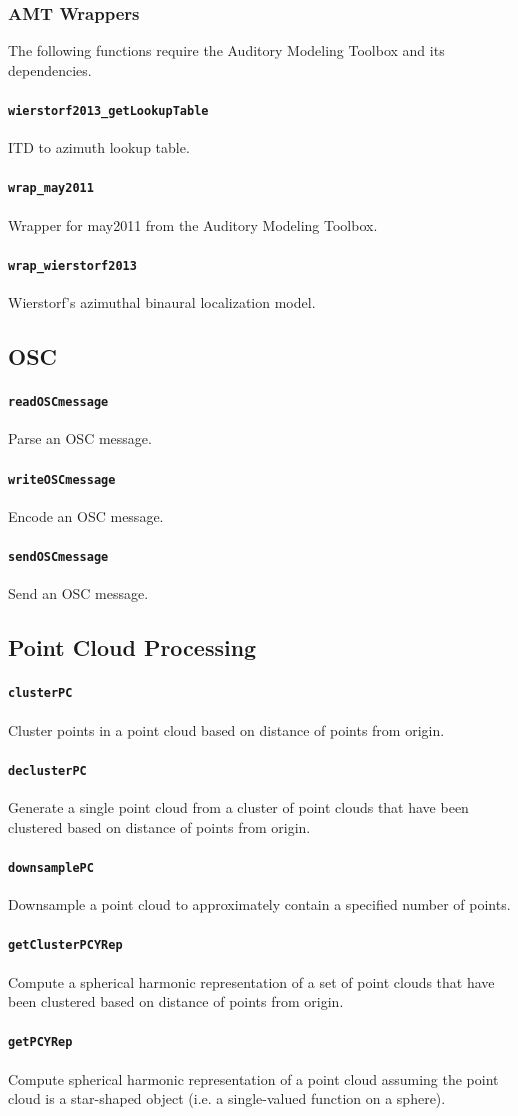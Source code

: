 \documentclass[11pt, oneside]{article}
\newcommand{\function}[1]{\paragraph*{\texttt{#1}}}
\begin{document}
\subsubsection{AMT Wrappers}

The following functions require the Auditory Modeling Toolbox and its dependencies.

\function{wierstorf2013\_getLookupTable} ITD to azimuth lookup table. \\

\function{wrap\_may2011} Wrapper for may2011 from the Auditory Modeling Toolbox. \\

\function{wrap\_wierstorf2013} Wierstorf's azimuthal binaural localization model.

\subsection{OSC}

\function{readOSCmessage} Parse an OSC message. \\

\function{writeOSCmessage} Encode an OSC message. \\

\function{sendOSCmessage} Send an OSC message. \\

\subsection{Point Cloud Processing}

\function{clusterPC} Cluster points in a point cloud based on distance of points from origin. \\

\function{declusterPC} Generate a single point cloud from a cluster of point clouds that have been clustered based on distance of points from origin. \\

\function{downsamplePC} Downsample a point cloud to approximately contain a specified number of points. \\

\function{getClusterPCYRep} Compute a spherical harmonic representation of a set of point clouds that have been clustered based on distance of points from origin. \\

\function{getPCYRep} Compute spherical harmonic representation of a point cloud assuming the point cloud is a star-shaped object (i.e. a single-valued function on a sphere). \\
\end{document}
